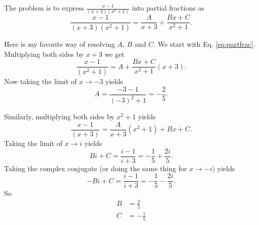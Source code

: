 \documentclass{article}
\begin{document}
The problem is to express $\frac{x - 1}{(x+3)(x^2+1)}$
into partial fractions as
\begin{equation}
\frac{x - 1}{(x+3)(x^2+1)} =
\frac{A}{x+3} + \frac{Bx+ C}{x^2+1}.
\label{eq:partfrac}
\end{equation}

Here is my favorite way of resolving $A$, $B$ and $C$.
We start with Eq. \eqref{eq:partfrac}.
Multiplying both sides by $x+3$ we get
$$
\frac{x - 1}{(x^2+1)} =
A + \frac{Bx+ C}{x^2+1} (x+3).
$$
Now taking the limit of $x \rightarrow -3$ yields
\begin{equation}
A = \frac{-3-1}{(-3)^2 + 1} = -\frac{2}{5}.
\end{equation}

Similarly, multiplying both sides by $x^2 + 1$ yields
$$
\frac{x - 1}{(x+3)} =
\frac{A}{x+3}(x^2+1) + Bx+ C.
$$
Taking the limit of $x\rightarrow i$ yields
$$
B i + C = \frac{i - 1}{i + 3} = -\frac{1}{5} + \frac{2 i}{5}.
$$
Taking the complex conjugate (or doing the same thing for $x \rightarrow -i$) yields
$$
-B i + C = \frac{i - 1}{i + 3} = -\frac{1}{5} - \frac{2 i}{5}.
$$
So
\begin{align}
B &= \frac{2}{5} \\
C &= -\frac{1}{5}
\end{align}
\end{document}
